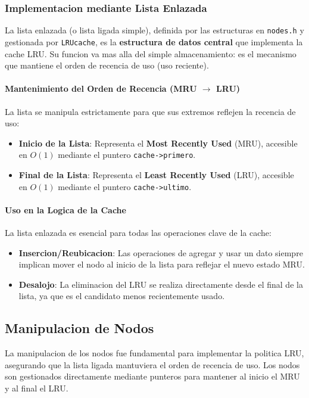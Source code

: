     \subsubsection{Implementacion mediante Lista Enlazada}
    La lista enlazada (o lista ligada simple), definida por las estructuras en \texttt{nodes.h} y gestionada por \texttt{LRUcache}, 
    es la \textbf{estructura de datos central} que implementa la cache LRU. Su funcion va mas alla del simple almacenamiento: es el mecanismo que mantiene el 
    orden de recencia de uso (uso reciente).
    \paragraph{Mantenimiento del Orden de Recencia (MRU $\rightarrow$ LRU)}
    La lista se manipula estrictamente para que sus extremos reflejen la recencia de uso:
    \begin{itemize}
        \item \textbf{Inicio de la Lista}: Representa el \textbf{Most Recently Used} (MRU), accesible en $O(1)$ mediante el puntero \texttt{cache->primero}.
        \item \textbf{Final de la Lista}: Representa el \textbf{Least Recently Used} (LRU), accesible en $O(1)$ mediante el puntero \texttt{cache->ultimo}.
    \end{itemize}

    \paragraph{Uso en la Logica de la Cache}
    La lista enlazada es esencial para todas las operaciones clave de la cache:
    \begin{itemize}
        \item \textbf{Insercion/Reubicacion}: Las operaciones de agregar y usar un dato siempre implican mover el nodo al inicio de la lista para reflejar el nuevo estado MRU.
        \item \textbf{Desalojo}: La eliminacion del LRU se realiza directamente desde el final de la lista, ya que es el candidato menos recientemente usado.
    \end{itemize}

    \subsection{Manipulacion de Nodos}
    La manipulacion de los nodos fue fundamental para implementar la politica LRU, asegurando que la lista ligada mantuviera el orden de recencia de uso. Los nodos son gestionados directamente mediante punteros para mantener al inicio el MRU y al final el LRU.


